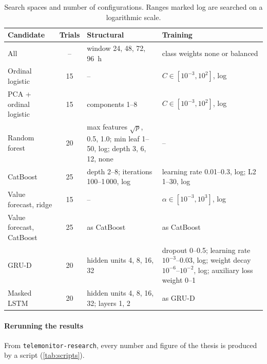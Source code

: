 \begin{table}[htbp]
\centering\footnotesize
\caption{Search spaces and number of configurations. Ranges marked log are searched on a logarithmic scale.}\label{tab:search-spaces}
\begin{tabularx}{\textwidth}{@{}>{\raggedright\arraybackslash}p{2.7cm} c >{\raggedright\arraybackslash}X >{\raggedright\arraybackslash}X@{}}
\toprule
\textbf{Candidate} & \textbf{Trials} & \textbf{Structural} & \textbf{Training} \\
\midrule
All & -- & window 24, 48, 72, 96~h & class weights none or balanced \\
Ordinal logistic & 15 & -- & $C \in [10^{-3}, 10^{2}]$, log \\
PCA + ordinal logistic & 15 & components 1--8 & $C \in [10^{-3}, 10^{2}]$, log \\
Random forest & 20 & max features $\sqrt{p}$, 0.5, 1.0; min leaf 1--50, log; depth 3, 6, 12, none & -- \\
CatBoost & 25 & depth 2--8; iterations 100--1\,000, log & learning rate 0.01--0.3, log; L2 1--30, log \\
Value forecast, ridge & 15 & -- & $\alpha \in [10^{-3}, 10^{3}]$, log \\
Value forecast, CatBoost & 25 & as CatBoost & as CatBoost \\
GRU-D & 20 & hidden units 4, 8, 16, 32 & dropout 0--0.5; learning rate $10^{-3}$--0.03, log; weight decay $10^{-6}$--$10^{-2}$, log; auxiliary loss weight 0--1 \\
Masked LSTM & 20 & hidden units 4, 8, 16, 32; layers 1, 2 & as GRU-D \\
\bottomrule
\end{tabularx}
\end{table}

\paragraph{Rerunning the results} From \texttt{telemonitor-research}, every number and figure of the thesis is produced by a script (\cref{tab:scripts}).

